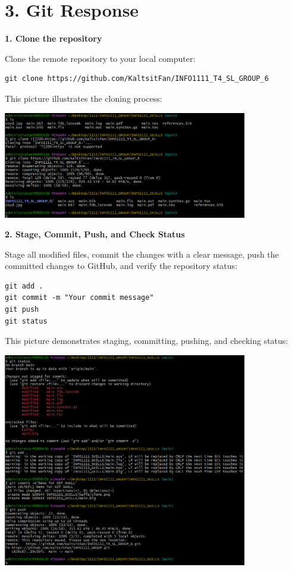 \documentclass[a4paper, 11pt]{report}
\begin{document}
\newpage

\section*{3. Git Response}

\textbf{1. Clone the repository}

Clone the remote repository to your local computer:
\begin{verbatim}
git clone https://github.com/KaltsitFan/INFO1111_T4_SL_GROUP_6
\end{verbatim}

This picture illustrates the cloning process: 

\begin{center}
\includegraphics[width=0.8\textwidth]{kaffa/clone.png}
\end{center}

\textbf{2. Stage, Commit, Push, and Check Status}

Stage all modified files, commit the changes with a clear message, push the committed changes to GitHub, and verify the repository status:

\begin{verbatim}
git add .
git commit -m "Your commit message"
git push
git status
\end{verbatim}

This picture demonstrates staging, committing, pushing, and checking status:

\begin{center}
\includegraphics[width=0.8\textwidth]{kaffa/push.png}
\end{center}
\end{document}
